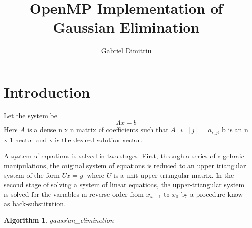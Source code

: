 \documentclass[a4paper]{article}
\newtheorem{algorithm}[theorem]{Algorithm}
\begin{document}
\title{OpenMP Implementation of Gaussian Elimination}
\date{}
\author{Gabriel Dimitriu}
\maketitle

\section{Introduction}

Let the system be 
\begin{equation}
Ax=b  \label{s1}
\end{equation}%
\qquad \qquad Here $A$ is a dense n x n matrix of coefficients such that $%
A[i][j]=a_{i,j}$, b is an n x 1 vector and x is the desired solution vector.

A system of equations is solved in two stages. First, through a series of
algebraic manipulations, the original system of equations is reduced to an
upper triangular system of the form $Ux=y$, where $U$ is a unit
upper-triangular matrix. In the second stage of solving a system of linear
equations, the upper-triangular system is solved for the variables in
reverse order from $x_{n-1}$ to $x_{0}$ by a procedure know as
back-substitution.

\begin{algorithm}
gaussian\_elimination
\end{algorithm}
\end{document}
